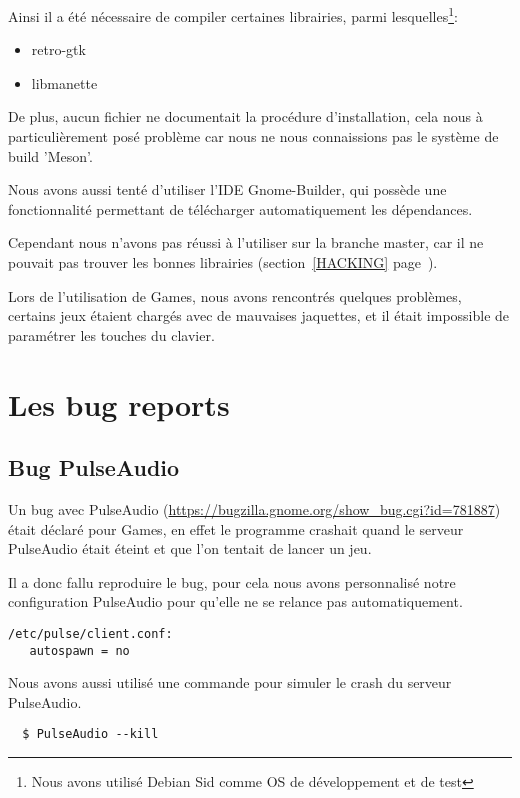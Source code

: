 \documentclass[12pt]{report}
\begin{document}
Ainsi il a été nécessaire de compiler certaines librairies, parmi
lesquelles\footnote{Nous avons utilisé Debian Sid comme OS de développement et de test}:
\begin{itemize}
\item retro-gtk
\item libmanette
\end{itemize}

De plus, aucun fichier ne documentait la procédure d'installation,
cela nous à particulièrement posé problème car nous ne nous
connaissions pas le système de build 'Meson'.

Nous avons aussi tenté d'utiliser l'IDE Gnome-Builder, qui possède une
fonctionnalité permettant de télécharger automatiquement les
dépendances.

Cependant nous n'avons pas réussi à l'utiliser sur la branche master,
car il ne pouvait pas trouver les bonnes librairies (section~\ref{HACKING}
page~\pageref{HACKING}).

Lors de l'utilisation de Games, nous avons rencontrés quelques
problèmes, certains jeux étaient chargés avec de mauvaises jaquettes,
et il était impossible de paramétrer les touches du clavier.

\section{Les bug reports}
\subsection{Bug PulseAudio}
\label{PulseAudio}
Un bug avec PulseAudio (\url{https://bugzilla.gnome.org/show_bug.cgi?id=781887})
était déclaré pour Games, en effet le programme crashait quand le serveur
PulseAudio était éteint et que l'on tentait de lancer un jeu.

Il a donc fallu reproduire le bug, pour cela nous avons personnalisé notre
configuration PulseAudio pour qu'elle ne se relance pas automatiquement.
\begin{verbatim}
/etc/pulse/client.conf:
   autospawn = no
\end{verbatim}

Nous avons aussi utilisé une commande pour simuler le crash du serveur PulseAudio.
\begin{verbatim}
  $ PulseAudio --kill
\end{verbatim}
\end{document}
